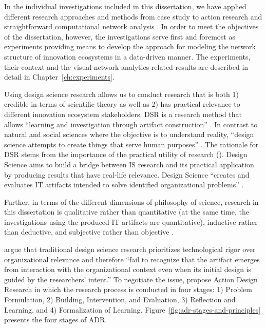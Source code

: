 In the individual investigations included in this dissertation, we have applied different research approaches and methods from case study \citep{Yin2003CaseMethods} to action research and straightforward computational network analysis \citep{Lazer2009ComputationalScience}. In order to meet the objectives of the dissertation, however, the investigations serve first and foremost as experiments providing means to develop the approach for modeling the network structure of innovation ecosystems in a data-driven manner. The experiments, their context and the visual network analytics-related results are described in detail in Chapter~\ref{ch:experiments}.

Using design science research allows us to conduct research that is both 1) credible in terms of scientific theory as well as 2) has practical relevance to different innovation ecosystem stakeholders. DSR is a research method that allows “learning and investigation through artifact construction” \citep[][p.~187]{Vaishnavi2007}. In contrast to natural and social sciences where the objective is to understand reality, ``design science attempts to create things that serve human purposes'' \citep{Simon1969}. The rationale for DSR stems from the importance of the practical utility of research (\citep{Peffers2007}). Design Science aims to build a bridge between IS research and its practical application by producing results that have real-life relevance. Design Science ``creates and evaluates IT artifacts intended to solve identified organizational problems'' \citep{Hevner2004}.

Further, in terms of the different dimensions of philosophy of science, research in this dissertation is qualitative rather than quantitative (at the same time, the investigations using the produced IT artifacts are quantitative), inductive rather than deductive, and subjective rather than objective \citep[cf.][]{Olsson2012UserServices}. 

\cite{Sein2011ActionResearch} argue that traditional design science research prioritizes technological rigor over organizational relevance and therefore ``fail to recognize that the artifact emerges from interaction with the organizational context even when its initial design is guided by the researchers’ intent.'' To negotiate the issue, \cite{Sein2011ActionResearch} propose Action Design Research in which the research process is conducted in four stages: 1) Problem Formulation, 2) Building, Intervention, and Evaluation, 3) Reflection and Learning, and 4) Formalization of Learning. Figure~\ref{fig:adr-stages-and-principles} presents the four stages of ADR.

